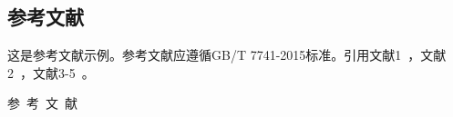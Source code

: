 \documentclass[10.5pt,compsoc,UTF8]{CjC}
\theoremstyle{mystyle}
\begin{document}

\subsection{参考文献}
这是参考文献示例。参考文献应遵循GB/T 7741-2015标准。引用文献1~\cite{Bohan1928}，文献2~\cite{chen1980zhongguo}，文献3-5~\cite{bravo1990comparative,niu2013zonghe,yuan2012lana}。





\vspace {10mm}

\vspace {10mm}
\centerline
{\textsf{参~考~文~献}}
 \addtolength{\itemsep}{-1em}
\vspace {1.5mm}











\end{document}
